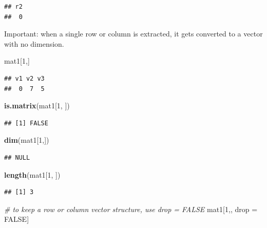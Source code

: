 \documentclass[]{book}
\newenvironment{Shaded}{\begin{snugshade}}{\end{snugshade}}
\newcommand{\KeywordTok}[1]{\textcolor[rgb]{0.13,0.29,0.53}{\textbf{{#1}}}}
\newcommand{\DecValTok}[1]{\textcolor[rgb]{0.00,0.00,0.81}{{#1}}}
\newcommand{\StringTok}[1]{\textcolor[rgb]{0.31,0.60,0.02}{{#1}}}
\newcommand{\CommentTok}[1]{\textcolor[rgb]{0.56,0.35,0.01}{\textit{{#1}}}}
\newcommand{\OtherTok}[1]{\textcolor[rgb]{0.56,0.35,0.01}{{#1}}}
\newcommand{\NormalTok}[1]{{#1}}
\theoremstyle{definition}
\theoremstyle{definition}
\theoremstyle{remark}
\begin{document}
\begin{verbatim}
## r2 
##  0
\end{verbatim}

Important: when a single row or column is extracted, it gets converted
to a vector with no dimension.

\begin{Shaded}
\begin{Highlighting}[]
\NormalTok{mat1[}\DecValTok{1}\NormalTok{,]}
\end{Highlighting}
\end{Shaded}

\begin{verbatim}
## v1 v2 v3 
##  0  7  5
\end{verbatim}

\begin{Shaded}
\begin{Highlighting}[]
\KeywordTok{is.matrix}\NormalTok{(mat1[}\DecValTok{1}\NormalTok{, ])  }
\end{Highlighting}
\end{Shaded}

\begin{verbatim}
## [1] FALSE
\end{verbatim}

\begin{Shaded}
\begin{Highlighting}[]
\KeywordTok{dim}\NormalTok{(mat1[}\DecValTok{1}\NormalTok{,])}
\end{Highlighting}
\end{Shaded}

\begin{verbatim}
## NULL
\end{verbatim}

\begin{Shaded}
\begin{Highlighting}[]
\KeywordTok{length}\NormalTok{(mat1[}\DecValTok{1}\NormalTok{, ])  }
\end{Highlighting}
\end{Shaded}

\begin{verbatim}
## [1] 3
\end{verbatim}

\begin{Shaded}
\begin{Highlighting}[]
\CommentTok{# to keep a row or column vector structure, use drop = FALSE}
\NormalTok{mat1[}\DecValTok{1}\NormalTok{,, drop =}\StringTok{ }\OtherTok{FALSE}\NormalTok{]}
\end{Highlighting}
\end{Shaded}
\end{document}
